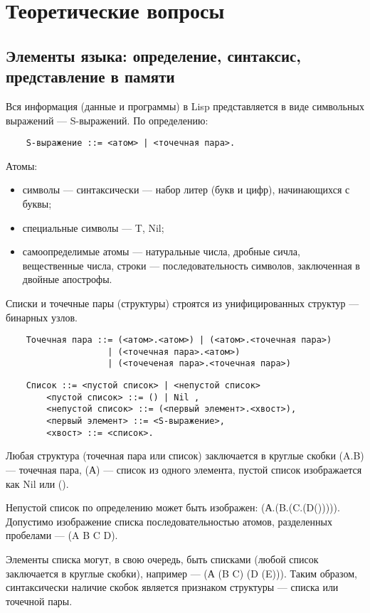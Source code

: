 \chapter{Теоретические вопросы}

\section{Элементы языка: определение, синтаксис, представление в памяти}

Вся информация (данные и программы) в Lisp представляется в виде символьных выражений --- S-выражений. По определению:
\begin{lstlisting}
	S-выражение ::= <атом> | <точечная пара>.
\end{lstlisting}

Атомы:
\begin{itemize}
	\item символы --- синтаксически --- набор литер (букв и цифр), начинающихся с буквы;
	\item специальные символы --- {T, Nil};
	\item самоопределимые атомы --- натуральные числа, дробные сичла, вещественные числа, строки --- последовательность символов, заключенная в двойные апострофы.
\end{itemize}

Списки и точечные пары (структуры) строятся из унифицированных структур --- бинарных узлов.

\begin{lstlisting}
	Точечная пара ::= (<атом>.<атом>) | (<атом>.<точечная пара>) 
					| (<точечная пара>.<атом>) 
					| (<точеченая пара>.<точечная пара>)
\end{lstlisting}

\begin{lstlisting}
	Список ::= <пустой список> | <непустой список>
		<пустой список> ::= () | Nil ,
		<непустой список> ::= (<первый элемент>.<хвост>), 
		<первый элемент> ::= <S-выражение>,
		<хвост> ::= <список>.
\end{lstlisting}

Любая структура (точечная пара или список) заключается в круглые
скобки (A.B) --- точечная пара, (А) --- список из одного элемента, пустой список изображается как Nil или ().

Непустой список по определению может быть изображен: (А.(B.(C.(D())))). Допустимо изображение списка последовательностью атомов, разделенных пробелами --- (A B C D).

Элементы списка могут, в свою очередь, быть списками (любой список заключается в круглые скобки), например --- (А (B C) (D (E))). Таким образом, синтаксически наличие скобок является признаком структуры --- списка или точечной пары.


